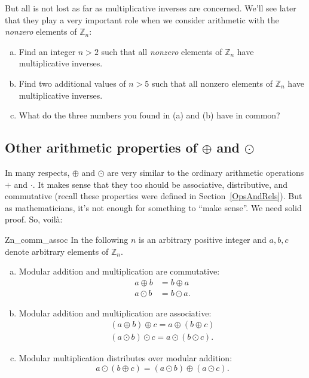 But all is not lost as far as multiplicative inverses are concerned. We'll see later that they play a very important role when we consider arithmetic with the \emph{nonzero} elements of ${\mathbb Z}_n$:

\begin{exercise}{60}
\begin{enumerate}[(a)]
\item
Find an integer $n>2$ such that all \emph{nonzero} elements of ${\mathbb Z}_n$ have multiplicative inverses.
\item
Find two additional values of $n>5$ such that all nonzero elements of ${\mathbb Z}_n$ have multiplicative inverses.
\item
What do the three numbers you found in (a) and (b) have in common?
\end{enumerate}
\end{exercise}

\subsection{Other arithmetic properties of $\oplus$ and $\odot$}

In many respects, $\oplus$ and $\odot$ are very similar to the ordinary arithmetic operations $+$ and $\cdot$. It makes sense that they too should be associative, distributive, and commutative  (recall these properties were defined   in Section~\ref{OpsAndRels}). But as mathematicians, it's not enough for something to ``make sense''. We need solid proof. So, voil\`{a}:

\begin{prop}{Zn_comm_assoc}
In the following $n$ is an arbitrary positive integer and $a, b, c$ denote arbitrary elements of ${\mathbb Z}_n$.
\begin{enumerate}[(a)]
 
\item \label{comm}  %
Modular addition and multiplication are commutative:  
\begin{align*}
a \oplus b  & =  b \oplus a  \\
a \odot b   & =  b \odot a .
\end{align*}
 
\item \label{assoc}  %
Modular addition and multiplication are associative: 
\begin{align*}
(a \oplus b) \oplus c  =  a \oplus (b \oplus c) \\
(a \odot b) \odot c    =  a \odot (b \odot c).
\end{align*}
 
\item \label{distrib}  %
Modular multiplication distributes over modular addition: 
\[
a \odot (b \oplus c)  = (a \odot b)\oplus (a \odot c).
\]
\end{enumerate}
\end{prop}

